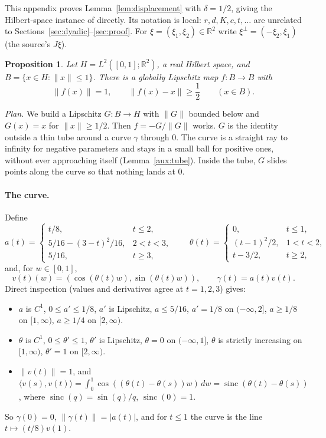\documentclass[11pt]{article}
\newcommand{\R}{\mathbb R}
\newcommand{\norm}[1]{\lVert #1\rVert}
\newcommand{\ip}[2]{\langle #1,#2\rangle}
\DeclareMathOperator{\sinc}{sinc}
\newtheorem{proposition}[theorem]{Proposition}
\theoremstyle{definition}
\numberwithin{equation}{section}
\begin{document}
This appendix proves Lemma~\ref{lem:displacement} with $\delta=1/2$,
giving the Hilbert-space instance of \cite{BenyaminiSternfeld1983} directly.
Its notation is local: $r,d,K,c,t,\dots$ are unrelated to
Sections~\ref{sec:dyadic}--\ref{sec:proof}. For $\xi=(\xi_1,\xi_2)\in\R^2$
write $\xi^\perp=(-\xi_2,\xi_1)$ (the source's $J\xi$).

\begin{proposition}\label{aux:map}
Let $H=L^2([0,1];\R^2)$, a real Hilbert space, and
$B=\{x\in H:\norm{x}\le1\}$. There is a globally Lipschitz map $f:B\to B$
with
\[
  \norm{f(x)}=1,\qquad\norm{f(x)-x}\ge\frac12\qquad(x\in B).
\]
\end{proposition}

\emph{Plan.} We build a Lipschitz $G:B\to H$ with $\norm{G}$ bounded below
and $G(x)=x$ for $\norm{x}\ge1/2$. Then $f=-G/\norm{G}$ works. $G$ is the
identity outside a thin tube around a curve $\gamma$ through $0$. The curve
is a straight ray to infinity for negative parameters and stays in a small
ball for positive ones, without ever approaching itself
(Lemma~\ref{aux:tube}). Inside the tube, $G$ slides points along the curve
so that nothing lands at $0$.

\paragraph{The curve.} Define
\[
 a(t)=
 \begin{cases}
 t/8,&t\le2,\\
 5/16-(3-t)^2/16,&2<t<3,\\
 5/16,&t\ge3,
 \end{cases}
 \qquad
 \theta(t)=
 \begin{cases}
 0,&t\le1,\\
 (t-1)^2/2,&1<t<2,\\
 t-3/2,&t\ge2,
 \end{cases}
\]
and, for $w\in[0,1]$,
\[
 v(t)(w)=(\cos(\theta(t)w),\sin(\theta(t)w)),\qquad\gamma(t)=a(t)v(t).
\]
Direct inspection (values and derivatives agree at $t=1,2,3$) gives:
\begin{itemize}
\item[(F1)] $a$ is $C^1$, $0\le a'\le1/8$, $a'$ is Lipschitz, $a\le5/16$,
 $a'=1/8$ on $(-\infty,2]$, $a\ge1/8$ on $[1,\infty)$, $a\ge1/4$ on
 $[2,\infty)$.
\item[(F2)] $\theta$ is $C^1$, $0\le\theta'\le1$, $\theta'$ is Lipschitz,
 $\theta=0$ on $(-\infty,1]$, $\theta$ is strictly increasing on
 $[1,\infty)$, $\theta'=1$ on $[2,\infty)$.
\item[(F3)] $\norm{v(t)}=1$, and
 $\ip{v(s)}{v(t)}=\int_0^1\cos((\theta(t)-\theta(s))w)\,dw
 =\sinc(\theta(t)-\theta(s))$, where $\sinc(q)=\sin(q)/q$, $\sinc(0)=1$.
\end{itemize}
So $\gamma(0)=0$, $\norm{\gamma(t)}=|a(t)|$, and for $t\le1$ the curve is
the line $t\mapsto(t/8)v(1)$.
\end{document}
